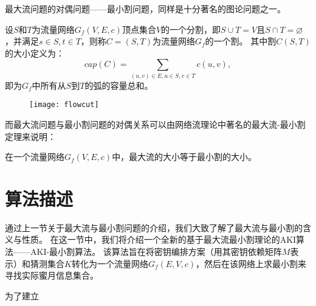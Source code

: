 最大流问题的对偶问题——最小割问题，同样是十分著名的图论问题之一。
\begin{defn}[割]
    设$S$和$T$为流量网络$G_f(V,E,c)$顶点集合$V$的一个分割，即$S\cup T=V$且$S\cap T=\varnothing$，并满足$s\in S,t\in T$，则称$C=(S,T)$为流量网络$G_f$的一个割。
    其中割$C(S,T)$的大小定义为：
    $$cap(C)=\sum_{(u,v)\in E,u\in S,v\in T}c(u,v),$$
    即为$G_f$中所有从$S$到$T$的弧的容量总和。
\end{defn}
\begin{figure}[htbp]
\centering
    \texttt{[image: flowcut]}
\end{figure}
而最大流问题与最小割问题的对偶关系可以由网络流理论中著名的最大流-最小割定理来说明：
\begin{thm}
    在一个流量网络$G_f(V,E,c)$中，最大流的大小等于最小割的大小。
\end{thm}

\section{算法描述}
通过上一节关于最大流与最小割问题的介绍，我们大致了解了最大流与最小割的含义与性质。
在这一节中，我们将介绍一个全新的基于最大流最小割理论的AKI算法——AKI-最小割算法。
该算法旨在将密钥编排方案（用其密钥依赖矩阵$M$表示）和猜测集合$K$转化为一个流量网络$G_f(E,V,c)$，然后在该网络上求最小割来寻找实际蜜月信息集合。

为了建立
